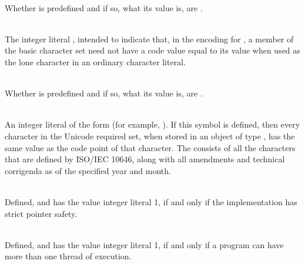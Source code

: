 \begin{description}
\item
{}%
\\
Whether  is predefined and if so, what its value is,
are .

\item
{}%
\\
The integer literal , intended to indicate that, in the encoding for
, a member of the basic character set need not have a code value equal to
its value when used as the lone character in an ordinary character literal.

\item
{}%
\\
Whether  is predefined and if so, what its value is,
are .

\item
{}%
\\
An integer literal of the form  (for example,
).
If this symbol is defined, then every character in the Unicode required set, when
stored in an object of type , has the same value as the code point
of that character. The  consists of all
the characters that are defined by ISO/IEC 10646, along with
all amendments and technical corrigenda as of the specified year and month.

\item
{}%
\\
Defined, and has the value integer literal 1, if and only if the implementation
has strict pointer safety.

\item
{}%
\\
Defined, and has the value integer literal 1, if and only if a program
can have more than one thread of execution.

\end{description}

